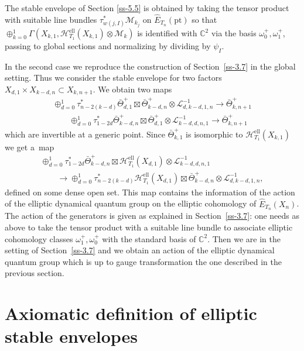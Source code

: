 \documentclass[pdftex]{sigma}
\numberwithin{equation}{section}
\begin{document}
The stable envelope of Section \ref{ss-5.5} is obtained by taking the tensor product with suitable line bundles $\tau^*_{w(j,I)}\mathcal M_{k_j}$ on $\hat E_{T_n}(\mathrm{pt})$ so that $\oplus_{k=0}^1\Gamma(X_{k,1},\mathcal
H^{\mathrm{ell}}_{T_1}(X_{k,1})\otimes \mathcal M_k)$ is identified with $\mathbb C^2$ via the basis $\omega_0^+,\omega_1^+$, passing to global sections and normalizing by dividing by $\psi_I$.

In the second case we reproduce the construction of Section~\ref{ss-3.7} in the global setting. Thus we consider the stable envelope for two factors $X_{d,1}\times X_{k-d,n}\subset X_{k,n+1}$.
We obtain two maps
\begin{gather*}
 \oplus_{d=0}^1\tau^*_{n-2(k-d)} \bar\Theta^+_{d,1}\boxtimes \bar\Theta^+_{k-d,n}\otimes \mathcal L_{d,k-d,1,n}^{-1} \to \bar\Theta^+_{k,n+1} \\
 \qquad{} \oplus_{d=0}^1\tau^*_{1-2d} \bar\Theta^+_{k-d,n} \boxtimes \bar\Theta^+_{d,1}\otimes \mathcal L_{k-d,d,n,1}^{-1} \to \bar\Theta^+_{k,n+1}
\end{gather*}
which are invertible at a generic point. Since $\bar\Theta^+_{k,1}$ is isomorphic to $\mathcal H^{\mathrm{ell}}_{T_1}(X_{k,1})$ we get a~map
\begin{gather*}
 \oplus_{d=0}^1\tau^*_{1-2d} \bar\Theta^+_{k-d,n} \boxtimes\mathcal H^{\mathrm{ell}}_{T_1}(X_{d,1}) \otimes \mathcal L_{k-d,d,n,1}^{-1}\\
\qquad{} \to \oplus_{d=0}^1\tau^*_{n-2(k-d)} \mathcal H^{\mathrm{ell}}_{T_1}(X_{d,1})\boxtimes \bar\Theta^+_{k-d,n}\otimes \mathcal L_{d,k-d,1,n}^{-1},
\end{gather*}
defined on some dense open set. This map contains the information of the action of the elliptic dynamical quantum group on the elliptic cohomology of $\hat E_{T_n}(X_{n})$. The action of the generators is given as explained in Section~\ref{ss-3.7}: one needs as above to take the tensor product with a suitable line bundle to associate elliptic cohomology classes $\omega^+_1,\omega^+_0$ with the standard basis of $\mathbb C^2$. Then we are in the setting of Section~\ref{ss-3.7} and we obtain an action of the elliptic dynamical quantum group which is up to gauge transformation the one described in the previous section.

\appendix
\section{Axiomatic definition of elliptic stable envelopes}\label{sec:appendix}
\end{document}
